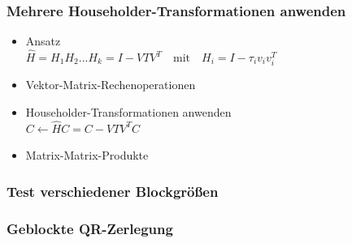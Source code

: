 \begin{frame}
	\frametitle{Mehrere Householder-Transformationen anwenden}	
	\vspace{-1cm}	
		\begin{itemize}
			\item Ansatz\\
			\vspace{0.3cm}
			$\hat{H} = H_1H_2...H_k = I - VTV^T \quad \text{mit}\quad H_i = I - \tau_i v_iv_i^T $
			\vspace{0.3cm}
			\item  Vektor-Matrix-Rechenoperationen
			\item Householder-Transformationen anwenden\\
			\vspace{0.3cm}
			$ C \leftarrow \hat{H} C = C - V T V^T C \quad $
			\item  Matrix-Matrix-Produkte
			
		\end{itemize}

		\vspace{-4cm}
		\hspace{9.6cm}
		\centering
		
\end{frame}



\begin{frame}
\frametitle{Test verschiedener Blockgrößen}
		\centering
\end{frame}

\begin{frame}
\frametitle{Geblockte QR-Zerlegung}
	\centering
\end{frame}

